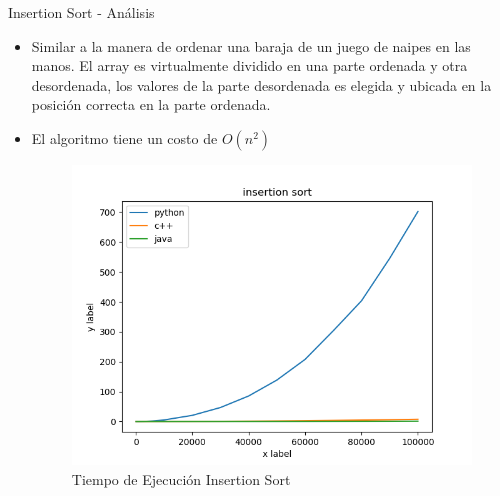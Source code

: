 \documentclass[11pt]{beamer}
\begin{document}
    		\begin{frame}{Insertion Sort - Análisis}
    		     \begin{itemize}
    		         \item Similar a la manera de ordenar una baraja de un juego de naipes en las manos. El array es virtualmente dividido en una parte ordenada y otra desordenada, los valores de la parte desordenada es elegida y ubicada en la posición correcta en la parte ordenada. 
    		         \item El algoritmo tiene un costo de $O(n^2)$ \cite{CLRS2009}
    		         
    		         \begin{figure}[H]
        				\centering
        				\includegraphics[scale=0.35]{img/insertion_diagram.png}
        				\caption{Tiempo de Ejecución Insertion Sort}
        				\label{fig: insertion_sort_fig1}
        			\end{figure}
    		         
    		     \end{itemize}
    		    
    		\end{frame}
		
\end{document}
